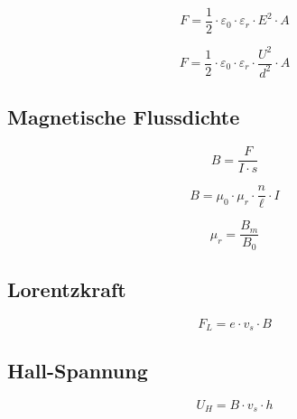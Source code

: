 \begin{equation}\label{eq:kondensator:anziehungskraft:elektrisches:feld}
F = \frac{1}{2}\cdot\varepsilon_0 \cdot
\varepsilon_r \cdot E^2 \cdot A
\end{equation}

\begin{equation}\label{eq:kondensator:anziehungskraft:spannung}
F = \frac{1}{2}\cdot\varepsilon_0 \cdot \varepsilon_r \cdot
 \frac{U^2}{d^2} \cdot A
\end{equation}

\subsection{Magnetische Flussdichte}
\begin{equation}\label{eq:magnetische:flussdichte}
B = \frac{F}{I \cdot s}
\end{equation}

\begin{equation}\label{eq:magnetische:flussdichte:schlanke:spule}
B = \mu_0 \cdot \mu_r \cdot \frac{n}{\ell} \cdot I
\end{equation}

\begin{equation}\label{eq:magnetische:flussdichte:relative:permeabilitaet}
\mu_r = \frac{B_m}{B_0}
\end{equation}

\subsection{Lorentzkraft}
\begin{equation}\label{eq:lorentzkraft}
F_L = e \cdot v_s \cdot B
\end{equation}

\subsection{Hall-Spannung}
\begin{equation}\label{eq:hall:spannung}
U_H = B \cdot v_s \cdot h
\end{equation}

